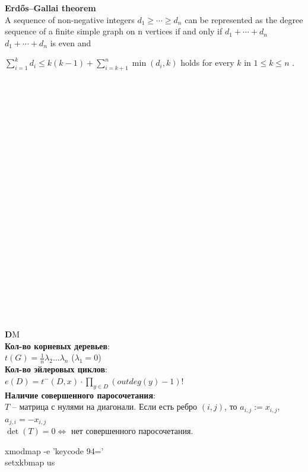 \documentclass[a4paper,10pt, twocolumn]{article}
\begin{document}
{\bf Erdős–Gallai theorem}\\
A sequence of non-negative integers  $d_{1}\geq \cdots \geq d_{n}$ can be represented as the degree sequence of a finite simple graph on n vertices if and only if $d_{1}+\cdots +d_{n}$ $d_1+\cdots+d_n$ is even and

$\sum _{i=1}^{k}d_{i}\leq k(k-1)+\sum _{i=k+1}^{n}\min(d_{i},k)$ 
holds for every $k$ in $1\leq k\leq n$ .


\pagebreak

\inputminted[linenos, breaklines]{c++}{code/sk.cpp}
\inputminted[linenos, breaklines]{c++}{code/euclid.cpp}
\inputminted[linenos, breaklines]{c++}{code/fft.cpp}
\inputminted[linenos, breaklines]{c++}{code/gauss.cpp}
\inputminted[linenos, breaklines]{c++}{code/geometry.h}
\inputminted[linenos, breaklines]{c++}{code/convex_hull.h}
\inputminted[linenos, breaklines]{c++}{code/convex_hull_trick.cpp}
\inputminted[linenos, breaklines]{c++}{code/hld.cpp}
\inputminted[linenos, breaklines]{c++}{code/max_flow.cpp}
\inputminted[linenos, breaklines]{c++}{code/min_cost.cpp}
\inputminted[linenos, breaklines]{c++}{code/hungarian.cpp}
\inputminted[linenos, breaklines]{c++}{code/edmonds.cpp}
\inputminted[linenos, breaklines]{c++}{code/strings.cpp}
\inputminted[linenos, breaklines]{c++}{code/min_cyclic_shift.cpp}
\inputminted[linenos, breaklines]{c++}{code/suffmas.cpp}
\inputminted[linenos, breaklines]{c++}{code/automaton.cpp}
\inputminted[linenos, breaklines]{c++}{code/pollard.cpp}
\inputminted[linenos, breaklines]{c++}{code/sieve.cpp}
\inputminted[linenos, breaklines]{c++}{code/discrete_log.cpp}
\inputminted[linenos, breaklines]{c++}{code/prime_roots.cpp}
\inputminted[linenos, breaklines]{c++}{code/simplex.cpp}
\inputminted[linenos, breaklines]{c++}{code/sum_over_subsets.cpp}
\inputminted[linenos, breaklines]{c++}{code/algebra}
\inputminted[linenos, breaklines]{c++}{code/wavelet_tree.cpp}
\inputminted[linenos, breaklines]{c++}{code/berlecamp-massey.cpp}
\inputminted[linenos, breaklines]{c++}{code/fft_and_ds.cpp}
\inputminted[linenos, breaklines]{c++}{code/2chinese.cpp}
\inputminted[linenos, breaklines]{c++}{code/general_max_weighted_match.cpp}
\inputminted[linenos, breaklines]{c++}{code/min_circulation.cpp}
\inputminted[linenos, breaklines]{c++}{code/hashtable.cpp}
\pagebreak
{\textbf DM}\\
{\bf Кол-во корневых деревьев}:\\
$t(G)=\frac 1 n \lambda_2 \ldots \lambda_n$ ($\lambda_1=0$)\\
{\bf Кол-во эйлеровых циклов}:\\
$e(D)=t^-(D,x) \cdot \prod\limits_{y\in D} (outdeg(y)-1)!$\\
{\bf Наличие совершенного паросочетания}:\\
$T$ -- матрица с нулями на диагонали. Если есть ребро $(i, j)$, то $a_{i,j}:=x_{i,j}$, $a_{j,i}=-x_{i,j}$\\
$\det(T)=0 \Leftrightarrow$ нет совершенного паросочетания.

\pagebreak
xmodmap -e 'keycode 94='\\
setxkbmap us \\
\end{document}
